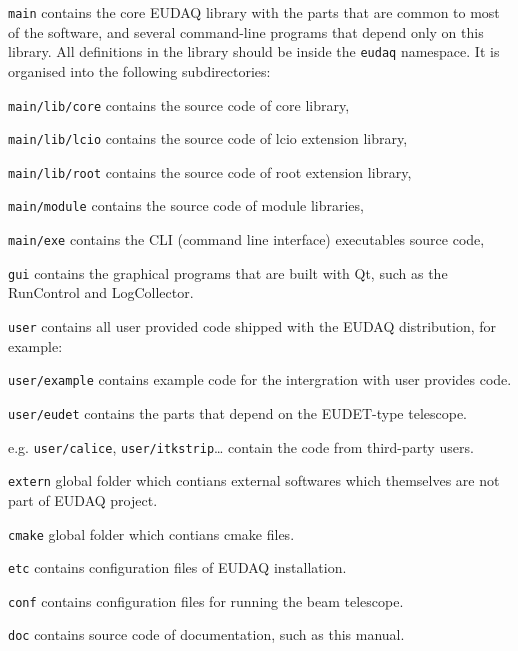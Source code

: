 \begin{myitemize}
\item \texttt{main}
  contains the core EUDAQ library with the parts that are common to most of the software,
  and several command-line programs that depend only on this library.
  All definitions in the library should be inside the \texttt{eudaq} namespace.
  It is organised into the following subdirectories:
  \begin{myitemize}
  \item \texttt{main/lib/core}
    contains the source code of core library,
  \item \texttt{main/lib/lcio}
    contains the source code of lcio extension library,
  \item \texttt{main/lib/root}
    contains the source code of root extension library,
  \item \texttt{main/module}
    contains the source code of module libraries,
  \item \texttt{main/exe}
    contains the CLI (command line interface) executables source code,
  \end{myitemize}
\item \texttt{gui}
  contains the graphical programs that are built with Qt, such as the RunControl and LogCollector.
\item \texttt{user}
  contains all user provided code shipped with the EUDAQ
  distribution, for example:
  \begin{myitemize}
\item \texttt{user/example}
  contains example code for the intergration with user provides code.
\item \texttt{user/eudet}
  contains the parts that depend on the EUDET-type telescope.
\item e.g. \texttt{user/calice}, \texttt{user/itkstrip}\ldots{}
  contain the code from third-party users.
  \end{myitemize}
\item \texttt{extern}
  global folder which contians external softwares which themselves are not part of EUDAQ project.
\item \texttt{cmake}
  global folder which contians cmake files.
\item \texttt{etc}
  contains configuration files of EUDAQ installation.
\item \texttt{conf}
  contains configuration files for running the beam telescope.
\item \texttt{doc}
  contains source code of documentation, such as this manual.
\end{myitemize}


